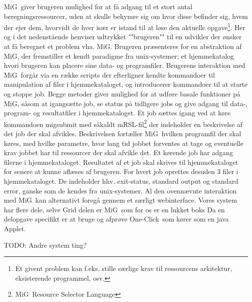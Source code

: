 \documentclass[pdf,draft,a4paper,10pt]{article}
\newcommand{\mig}{MiG}
\newcommand{\oc}{One-Click}
\begin{document}
\mig\ giver brugeren mulighed for at få adgang til et stort antal beregningsressourcer, uden at skulle bekymre sig om hvor disse befinder sig, hvem der ejer dem, hvorvidt de hver især er istand til at løse den aktuelle opgave\footnote{Et givent problem kan f.eks. stille særlige krav til ressourcens arkitektur, eksisterende programmel, osv. }. Her og i det nedenstående henviser udtrykket ""brugeren"" til en udvikler der ønsker at få beregnet et problem vha. \mig {}. Brugeren præsenteres for en abstraktion af \mig, der fremstiller et kendt paradigme fra unix-systemer; et hjemmekatalog hvori brugeren kan placere sine data- og programfiler. Brugerens interaktion med \mig\ forgår via en række scripts der efterligner kendte kommandoer til manipulation af filer i hjemmekataloget, og introducerer kommandoer til at starte og stoppe job. Begge metoder giver mulighed for at udføre basale funktioner på \mig, såsom at igangsætte job, se status på tidligere jobs og give adgang til data-, program- og resultatfiler i hjemmekataloget. Et job sættes igang ved at køre kommandoen migsubmit med såkaldt mRSL-fil\footnote{\mig\ Resource Selector Language} der indeholder en beskrivelse af det job der skal afvikles. Beskrivelsen fortæller \mig\ hvilken programfil der skal køres, med hvilke parametre, hvor lang tid jobbet forventes at tage og eventuelle krav jobbet har til ressourcer der skal afvikle det. Et kørende job har adgang filerne i  hjemmekataloget. Resultatet af et job skal skrives til hjemmekataloget for senere at kunne aflæses af brugeren. For hvert job oprettes desuden 3 filer i hjemmekataloget. De indeholder hhv. exit-status, standard output og standard error, ganske som de kendes fra unix-systemer. 
Al den ovennævnte interaktion med \mig\ kan alternativt foregå gennem et særligt webinterface. 
Vores system har flere dele, selve Grid delen er \mig\ som for os er en lukket boks
Da en delopgave specifikt er at bruge og afprøve \oc\ som kører som en java Applet.

TODO: Andre system ting?
\end{document}
